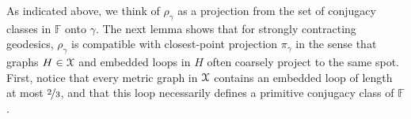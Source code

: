 \documentclass[letterpaper,fleqn]{article}
\theoremstyle{plain}
\theoremstyle{definition}
\newcommand{\free}{\mathbb{F}} %
\newcommand{\os}{{\EuScript X}} %
\newcommand{\cp}{\pi} %
\newcommand{\minlen}{m}  %
\newcommand{\minpts}{\rho} %
\begin{document}
As indicated above, we think of $\minpts_\gamma$ as a projection from the set of conjugacy classes in $\free$ onto $\gamma$. The next lemma shows that for strongly contracting geodesics, $\minpts_\gamma$ is compatible with closest-point projection $\cp_\gamma$ in the sense that graphs $H\in \os$ and embedded loops in $H$ often coarsely project to the same spot. First, notice that every metric graph in $\os$ contains an embedded loop of length at most $\nicefrac{2}{3}$, and that this loop necessarily defines a primitive conjugacy class of $\free$.
\end{document}
